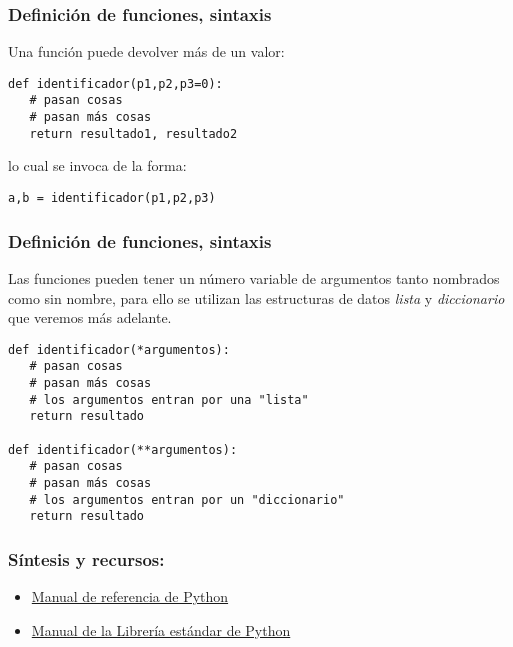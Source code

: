 \documentclass{beamer}
\begin{document}
\begin{frame}[fragile]
\frametitle{Definición de funciones, sintaxis}
Una función puede devolver más de un valor:
\begin{block}{}
\begin{verbatim}
def identificador(p1,p2,p3=0):
   # pasan cosas
   # pasan más cosas
   return resultado1, resultado2   
\end{verbatim}
lo cual se invoca de la forma:
\begin{verbatim}
a,b = identificador(p1,p2,p3)
\end{verbatim}
\end{block}
\end{frame}

\begin{frame}[fragile]
\frametitle{Definición de funciones, sintaxis}
Las funciones pueden tener un número variable de argumentos tanto nombrados como sin nombre, para ello se utilizan las estructuras de datos {\em lista} y {\em diccionario} que veremos más adelante.
\begin{block}{}
\begin{verbatim}
def identificador(*argumentos):
   # pasan cosas
   # pasan más cosas
   # los argumentos entran por una "lista"
   return resultado 
 
def identificador(**argumentos):
   # pasan cosas
   # pasan más cosas
   # los argumentos entran por un "diccionario"
   return resultado   
\end{verbatim}
\end{block}
\end{frame}

\begin{frame}
\frametitle{Síntesis y recursos:}

\begin{itemize}
\item \href{https://docs.python.org/3/reference/index.html}{Manual de referencia de Python}
\item \href{https://docs.python.org/3/library/index.html}{Manual de la Librería estándar de Python}
\end{itemize}
\end{frame}
\end{document}
